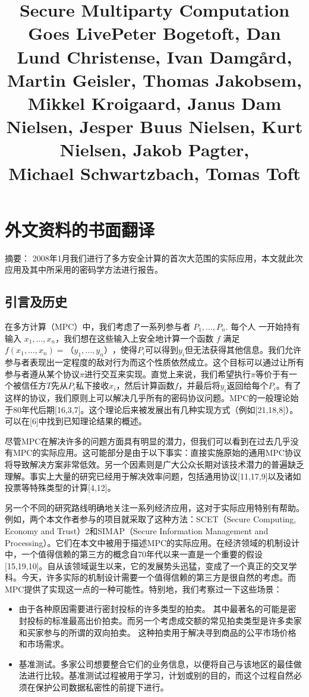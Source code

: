 \chapter{外文资料的书面翻译}

\title{\large Secure Multiparty Computation Goes Live}
\title{\small Peter Bogetoft, Dan Lund Christense, Ivan Damg\aa rd, Martin Geisler, Thomas Jakobsem,\\Mikkel Kroigaard, Janus Dam Nielsen, Jesper Buus Nielsen, Kurt Nielsen, Jakob Pagter,\\Michael Schwartzbach, Tomas Toft}

{\heiti 摘要：} 2008年1月我们进行了多方安全计算的首次大范围的实际应用，本文就此次应用及其中所采用的密码学方法进行报告。

\section{引言及历史}
在多方计算（MPC）中，我们考虑了一系列参与者 $P_1,\dots,P_n$. 每个人
一开始持有输入 $x_1,\dots,x_n$，我们想在这些输入上安全地计算一个函数 $f$ 满足$f(x_1,\dots,x_n)=（y_1,\dots,y_n）$，使得$P_i$可以得到$y_i$但无法获得其他信息。我们允许参与者表现出一定程度的敌对行为而这个性质依然成立。这个目标可以通过让所有参与者遵从某个协议$\pi$进行交互来实现。直觉上来说，我们希望执行$\pi$等价于有一个被信任方$T$先从$P_i$私下接收$x_i$，然后计算函数$f$，并最后将$y_i$返回给每个$P_i$。有了这样的协议，我们原则上可以解决几乎所有的密码协议问题。MPC的一般理论始于80年代后期[16,3,7]。这个理论后来被发展出有几种实现方式（例如[21,18,8]）。可以在[6]中找到已知理论结果的概述。

尽管MPC在解决许多的问题方面具有明显的潜力，但我们可以看到在过去几乎没有MPC的实际应用。这可能部分是由于以下事实：直接实施原始的通用MPC协议将导致解决方案非常低效。另一个因素则是广大公众长期对该技术潜力的普遍缺乏理解。事实上大量的研究已经用于解决效率问题，包括通用协议[11,17,9]以及诸如投票等特殊类型的计算[4,12]。

另一个不同的研究路线明确地关注一系列经济应用，这对于实际应用特别有帮助。例如，两个本文作者参与的项目就采取了这种方法：SCET（Secure Computing, Economy and Trust）2和SIMAP（Secure Information Management and Processing）。它们在本文中被用于描述MPC的实际应用。在经济领域的机制设计中，一个值得信赖的第三方的概念自70年代以来一直是一个重要的假设[15,19,10]。自从该领域诞生以来，它的发展势头迅猛，变成了一个真正的交叉学科。今天，许多实际的机制设计需要一个值得信赖的第三方是很自然的考虑。而MPC提供了实现这一点的一种可能性。特别地，我们考察过一下这些场景：
\begin{itemize}
	\item 由于各种原因需要进行密封投标的许多类型的拍卖。 其中最著名的可能是密封投标的标准最高出价拍卖。而另一个考虑成交额的常见拍卖类型是许多卖家和买家参与的所谓的双向拍卖。 这种拍卖用于解决寻到商品的公平市场价格和市场需求。
	\item 基准测试。多家公司想要整合它们的业务信息，以便将自己与该地区的最佳做法进行比较。基准测试过程被用于学习，计划或别的目的，而这个过程自然必须在保护公司数据私密性的前提下进行。
\end{itemize}

